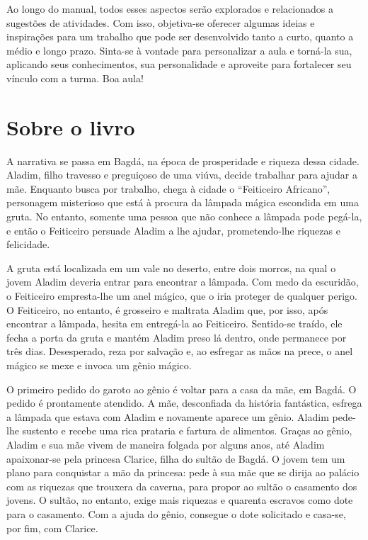 \documentclass[11pt]{extarticle}
\begin{document}

Ao longo do manual, todos esses aspectos serão explorados e relacionados a sugestões de atividades. Com isso, objetiva-se oferecer algumas ideias e inspirações para um trabalho que pode ser desenvolvido tanto a curto, quanto a médio e longo prazo. Sinta-se à vontade para personalizar a aula e torná-la sua, aplicando seus conhecimentos, sua 
personalidade e aproveite para fortalecer seu vínculo com a turma.
Boa aula!



\section{Sobre o livro}
A narrativa se passa em Bagdá, na época de prosperidade e riqueza dessa cidade.
Aladim, filho travesso e preguiçoso de uma viúva, decide trabalhar para ajudar a mãe.
Enquanto busca por trabalho, chega à cidade o “Feiticeiro Africano”, personagem misterioso que está à procura da lâmpada mágica escondida em uma gruta. No entanto, somente uma pessoa que não conhece a lâmpada pode pegá-la, e então o Feiticeiro persuade Aladim a lhe ajudar, prometendo-lhe riquezas e felicidade.

A gruta está localizada em um vale no deserto, entre dois morros, na qual o jovem Aladim deveria entrar para encontrar a lâmpada. Com medo da escuridão, o Feiticeiro empresta-lhe um anel mágico, que o iria proteger de qualquer perigo. O Feiticeiro, no entanto, é grosseiro e maltrata Aladim que, por isso, após encontrar a lâmpada, hesita em entregá-la ao Feiticeiro. Sentido-se traído, ele fecha a porta da gruta e mantém Aladim preso lá dentro, onde permanece por três dias. Desesperado, reza por salvação e, ao esfregar as mãos na prece, o anel mágico se mexe e invoca um gênio mágico.

O primeiro pedido do garoto ao gênio é voltar para a casa da mãe, em Bagdá. O pedido é prontamente atendido. A mãe, desconfiada da história fantástica, esfrega a lâmpada que estava com Aladim e novamente aparece um gênio. Aladim pede-lhe sustento e recebe uma rica prataria e fartura de alimentos. Graças ao gênio, Aladim e sua mãe vivem de maneira folgada por alguns anos, até Aladim apaixonar-se pela princesa Clarice, filha do sultão de Bagdá. O jovem tem um plano para conquistar a mão da princesa: pede à sua mãe que se dirija ao palácio com as riquezas que trouxera da caverna, para propor ao sultão o casamento dos jovens. O sultão, no entanto, exige mais riquezas e quarenta escravos como dote para o casamento. Com a ajuda do gênio, consegue o dote solicitado e casa-se, por fim, com Clarice.
\end{document}
